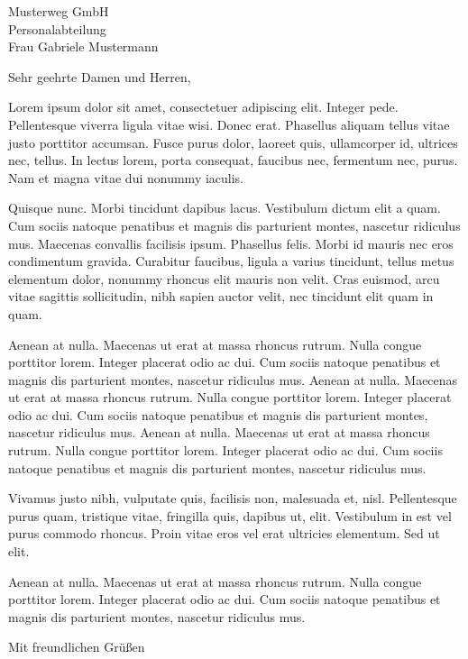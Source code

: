 \documentclass[sample]{scrlttr2}
\begin{document}
\begin{letter}{Musterweg GmbH \\ Personalabteilung \\ Frau Gabriele Mustermann }

\opening{Sehr geehrte Damen und Herren,}

Lorem ipsum dolor sit amet, consectetuer adipiscing elit. Integer pede. Pellentesque viverra ligula vitae wisi. Donec erat. Phasellus aliquam tellus vitae justo porttitor accumsan. Fusce purus dolor, laoreet quis, ullamcorper id, ultrices nec, tellus. In lectus lorem, porta consequat, faucibus nec, fermentum nec, purus. Nam et magna vitae dui nonummy iaculis.

Quisque nunc. Morbi tincidunt dapibus lacus. Vestibulum dictum elit a quam. Cum sociis natoque penatibus et magnis dis parturient montes, nascetur ridiculus mus. Maecenas convallis facilisis ipsum. Phasellus felis. Morbi id mauris nec eros condimentum gravida. Curabitur faucibus, ligula a varius tincidunt, tellus metus elementum dolor, nonummy rhoncus elit mauris non velit. Cras euismod, arcu vitae sagittis sollicitudin, nibh sapien auctor velit, nec tincidunt elit quam in quam.

Aenean at nulla. Maecenas ut erat at massa rhoncus rutrum. Nulla congue porttitor lorem. Integer placerat odio ac dui. Cum sociis natoque penatibus et magnis dis parturient montes, nascetur ridiculus mus. Aenean at nulla. Maecenas ut erat at massa rhoncus rutrum. Nulla congue porttitor lorem. Integer placerat odio ac dui. Cum sociis natoque penatibus et magnis dis parturient montes, nascetur ridiculus mus. 
Aenean at nulla. Maecenas ut erat at massa rhoncus rutrum. Nulla congue porttitor lorem. Integer placerat odio ac dui. Cum sociis natoque penatibus et magnis dis parturient montes, nascetur ridiculus mus. 


Vivamus justo nibh, vulputate quis, facilisis non, malesuada et, nisl. Pellentesque purus quam, tristique vitae, fringilla quis, dapibus ut, elit. Vestibulum in est vel purus commodo rhoncus. Proin vitae eros vel erat ultricies elementum. Sed ut elit. 

Aenean at nulla. Maecenas ut erat at massa rhoncus rutrum. Nulla congue porttitor lorem. Integer placerat odio ac dui. Cum sociis natoque penatibus et magnis dis parturient montes, nascetur ridiculus mus. 

\closing{Mit freundlichen Grüßen}


\end{letter}
\end{document}
